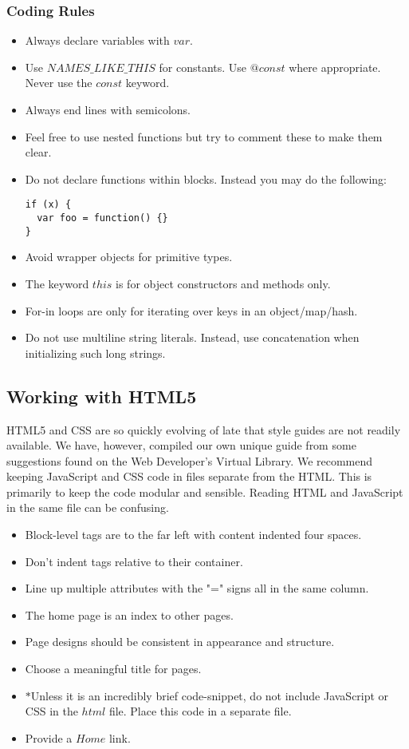 \documentclass[12pt]{article}
\begin{document}
\subsubsection{Coding Rules}
\begin{itemize}
\item Always declare variables with $var$.
\item Use $NAMES\_LIKE\_THIS$ for constants. Use $@const$ where appropriate. Never use the $const$ keyword. 
\item Always end lines with semicolons.
\item Feel free to use nested functions but try to comment these to make them clear.
\item Do not declare functions within blocks.  Instead you may do the following:
\begin{verbatim}
if (x) {
  var foo = function() {}
}
\end{verbatim}
\item Avoid wrapper objects for primitive types.
\item The keyword $this$ is for object constructors and methods only.
\item For-in loops are only for iterating over keys in an object/map/hash.
\item Do not use multiline string literals.  Instead, use concatenation when initializing such long strings.
\end{itemize}

\subsection{Working with HTML5}
HTML5 and CSS are so quickly evolving of late that style guides are not readily available.  We have, however, compiled our own unique guide from some suggestions found on the Web Developer's Virtual Library\cite{HTMLStyle-WDVL}.  We recommend keeping JavaScript and CSS code in files separate from the HTML.  This is primarily to keep the code modular and sensible.  Reading HTML and JavaScript in the same file can be confusing.

\begin{itemize}
\item Block-level tags are to the far left with content indented four spaces.
\item Don't indent tags relative to their container.
\item Line up multiple attributes with the "=" signs all in the same column.
\item The home page is an index to other pages.
\item Page designs should be consistent in appearance and structure.
\item Choose a meaningful title for pages.
\item $*$Unless it is an incredibly brief code-snippet, do not include JavaScript or CSS in the $html$ file.  Place this code in a separate file.
\item Provide a $Home$ link.
\end{itemize}
\end{document}
